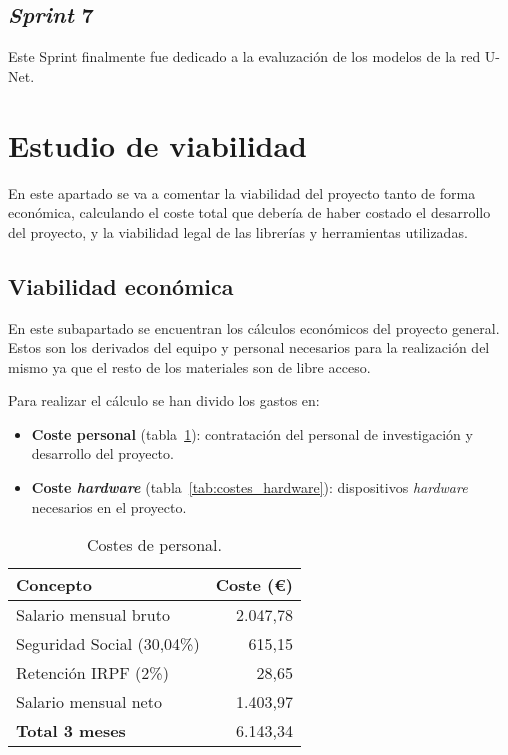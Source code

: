 \subsection{\textit{Sprint} 7}
Este Sprint finalmente fue dedicado a la evaluzación de los modelos de la red U-Net.

\section{Estudio de viabilidad}

En este apartado se va a comentar la viabilidad del proyecto tanto de forma económica, calculando el coste total que debería de haber costado el desarrollo del proyecto, y la viabilidad legal de las librerías y herramientas utilizadas.

\subsection{Viabilidad económica}

En este subapartado se encuentran los cálculos económicos del proyecto general.
Estos son los derivados del equipo y personal necesarios para la realización del mismo ya que el resto de los materiales son de libre acceso.

Para realizar el cálculo se han divido los gastos en:
\begin{itemize}
	\item \textbf{Coste personal} (tabla~\ref{tab:costes_personal}): contratación del personal de investigación y desarrollo del proyecto.
	\item \textbf{Coste \textit{hardware}} (tabla~\ref{tab:costes_hardware}): dispositivos \textit{hardware} necesarios en el proyecto.
\end{itemize}

\begin{table}\centering
	\begin{tabular}[]{@{}l r@{}}
		\toprule
		\textbf{Concepto} & \textbf{Coste (\euro{})} \\
		\midrule
		Salario mensual bruto & 2.047,78 \\
		Seguridad Social (30,04\%) & 615,15 \\
		Retención IRPF (2\%) & 28,65 \\
		Salario mensual neto & 1.403,97 \\\hubu
		\textbf{Total 3 meses } &  6.143,34 \\
		\bottomrule
	\end{tabular}
	\caption{Costes de personal.}
	\label{tab:costes_personal}
\end{table}

